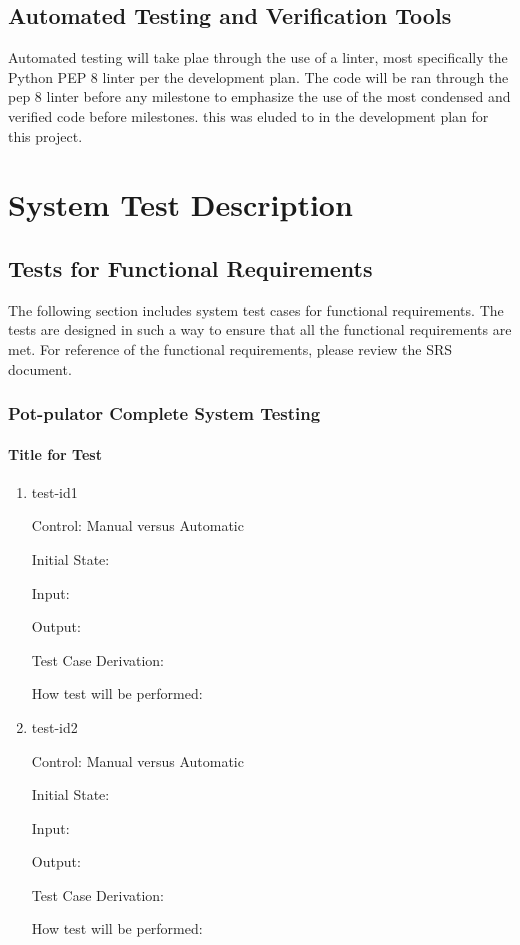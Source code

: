 \documentclass[12pt, titlepage]{article}
\begin{document}
\subsection{Automated Testing and Verification Tools}

Automated testing will take plae through the use of a linter, most specifically the Python
PEP 8 linter per the development plan. The code will be ran through the pep 8 linter before
any milestone to emphasize the use of the most condensed and verified code before milestones.
this was eluded to in the development plan for this project.


\section{System Test Description}
	
\subsection{Tests for Functional Requirements}

The following section includes system test cases for functional requirements.
The tests are designed in such a way to ensure that all the functional requirements are met.
For reference of the functional requirements, please review the SRS document.


\subsubsection{Pot-pulator Complete System Testing}

		
\paragraph{Title for Test}

\begin{enumerate}

\item{test-id1\\}

Control: Manual versus Automatic
					
Initial State: 
					
Input: 
					
Output: 

Test Case Derivation: 
					
How test will be performed: 
					
\item{test-id2\\}

Control: Manual versus Automatic
					
Initial State: 
					
Input: 
					
Output: 

Test Case Derivation: 

How test will be performed: 

\end{enumerate}
\end{document}
